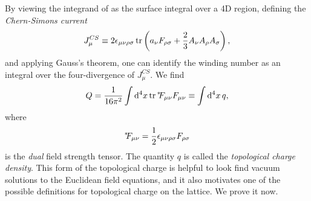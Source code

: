 By viewing the integrand of  
as the surface integral over a 4D region, defining the 
{\it Chern-Simons current}
\begin{equation}
  J_\mu^{CS}\equiv 2\epsilon_{\mu\nu\rho\sigma}\tr
    \left(a_\nu F_{\rho\sigma} +\frac{2}{3}A_\nu A_\rho A_\sigma\right),
\end{equation}
and applying Gauss's theorem, one can identify the winding number as 
an integral over the four-divergence of $J_\mu^{CS}$. We find
\begin{equation}\label{eq:Q}
  Q=\frac{1}{16\pi^2}\int\dd[4]{x}\tr\dual{F_{\mu\nu}}F_{\mu\nu}
   \equiv \int\dd[4]{x}q,
\end{equation}
where
\begin{equation} 
{}^{*\hspace{-1mm}}{F}_{\mu\nu}=\frac{1}{2}\epsilon_{\mu\nu\rho\sigma}F_{\rho\sigma}
\end{equation}
is the {\it dual} field strength tensor. The quantity
$q$ is called the {\it topological charge density}. This form of the
topological charge is helpful to look find vacuum solutions to the
Euclidean field equations, and it also motivates one of the possible
definitions for topological charge on the lattice. We prove it now.
